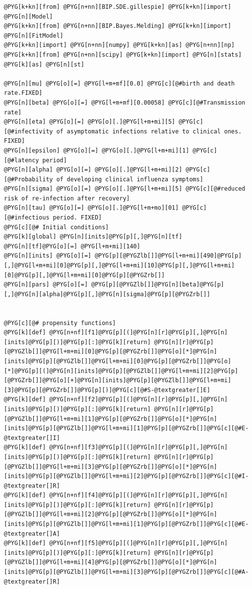 \documentclass[a4paper,10pt,english]{manual}
\begin{document}
\begin{Verbatim}[commandchars=@\[\]]
@PYG[k+kn][from] @PYG[n+nn][BIP.SDE.gillespie] @PYG[k+kn][import] @PYG[n][Model]
@PYG[k+kn][from] @PYG[n+nn][BIP.Bayes.Melding] @PYG[k+kn][import] @PYG[n][FitModel]
@PYG[k+kn][import] @PYG[n+nn][numpy] @PYG[k+kn][as] @PYG[n+nn][np]
@PYG[k+kn][from] @PYG[n+nn][scipy] @PYG[k+kn][import] @PYG[n][stats] @PYG[k][as] @PYG[n][st]

@PYG[n][mu] @PYG[o][=] @PYG[l+m+mf][0.0] @PYG[c][@#birth and death rate.FIXED]
@PYG[n][beta] @PYG[o][=] @PYG[l+m+mf][0.00058] @PYG[c][@#Transmission rate]
@PYG[n][eta] @PYG[o][=] @PYG[o][.]@PYG[l+m+mi][5] @PYG[c][@#infectivity of asymptomatic infections relative to clinical ones. FIXED]
@PYG[n][epsilon] @PYG[o][=] @PYG[o][.]@PYG[l+m+mi][1] @PYG[c][@#latency period]
@PYG[n][alpha] @PYG[o][=] @PYG[o][.]@PYG[l+m+mi][2] @PYG[c][@#Probability of developing clinical influenza symptoms]
@PYG[n][sigma] @PYG[o][=] @PYG[o][.]@PYG[l+m+mi][5] @PYG[c][@#reduced risk of re-infection after recovery]
@PYG[n][tau] @PYG[o][=] @PYG[o][.]@PYG[l+m+mo][01] @PYG[c][@#infectious period. FIXED]
@PYG[c][@# Initial conditions]
@PYG[k][global] @PYG[n][inits]@PYG[p][,]@PYG[n][tf]
@PYG[n][tf]@PYG[o][=] @PYG[l+m+mi][140]
@PYG[n][inits] @PYG[o][=] @PYG[p][@PYGZlb[]]@PYG[l+m+mi][490]@PYG[p][,]@PYG[l+m+mi][0]@PYG[p][,]@PYG[l+m+mi][10]@PYG[p][,]@PYG[l+m+mi][0]@PYG[p][,]@PYG[l+m+mi][0]@PYG[p][@PYGZrb[]]
@PYG[n][pars] @PYG[o][=] @PYG[p][@PYGZlb[]]@PYG[n][beta]@PYG[p][,]@PYG[n][alpha]@PYG[p][,]@PYG[n][sigma]@PYG[p][@PYGZrb[]]


@PYG[c][@# propensity functions]
@PYG[k][def] @PYG[n+nf][f1]@PYG[p][(]@PYG[n][r]@PYG[p][,]@PYG[n][inits]@PYG[p][)]@PYG[p][:]@PYG[k][return] @PYG[n][r]@PYG[p][@PYGZlb[]]@PYG[l+m+mi][0]@PYG[p][@PYGZrb[]]@PYG[o][*]@PYG[n][inits]@PYG[p][@PYGZlb[]]@PYG[l+m+mi][0]@PYG[p][@PYGZrb[]]@PYG[o][*]@PYG[p][(]@PYG[n][inits]@PYG[p][@PYGZlb[]]@PYG[l+m+mi][2]@PYG[p][@PYGZrb[]]@PYG[o][+]@PYG[n][inits]@PYG[p][@PYGZlb[]]@PYG[l+m+mi][3]@PYG[p][@PYGZrb[]]@PYG[p][)]@PYG[c][@#S-@textgreater[]E]
@PYG[k][def] @PYG[n+nf][f2]@PYG[p][(]@PYG[n][r]@PYG[p][,]@PYG[n][inits]@PYG[p][)]@PYG[p][:]@PYG[k][return] @PYG[n][r]@PYG[p][@PYGZlb[]]@PYG[l+m+mi][1]@PYG[p][@PYGZrb[]]@PYG[o][*]@PYG[n][inits]@PYG[p][@PYGZlb[]]@PYG[l+m+mi][1]@PYG[p][@PYGZrb[]]@PYG[c][@#E-@textgreater[]I]
@PYG[k][def] @PYG[n+nf][f3]@PYG[p][(]@PYG[n][r]@PYG[p][,]@PYG[n][inits]@PYG[p][)]@PYG[p][:]@PYG[k][return] @PYG[n][r]@PYG[p][@PYGZlb[]]@PYG[l+m+mi][3]@PYG[p][@PYGZrb[]]@PYG[o][*]@PYG[n][inits]@PYG[p][@PYGZlb[]]@PYG[l+m+mi][2]@PYG[p][@PYGZrb[]]@PYG[c][@#I-@textgreater[]R]
@PYG[k][def] @PYG[n+nf][f4]@PYG[p][(]@PYG[n][r]@PYG[p][,]@PYG[n][inits]@PYG[p][)]@PYG[p][:]@PYG[k][return] @PYG[n][r]@PYG[p][@PYGZlb[]]@PYG[l+m+mi][2]@PYG[p][@PYGZrb[]]@PYG[o][*]@PYG[n][inits]@PYG[p][@PYGZlb[]]@PYG[l+m+mi][1]@PYG[p][@PYGZrb[]]@PYG[c][@#E-@textgreater[]A]
@PYG[k][def] @PYG[n+nf][f5]@PYG[p][(]@PYG[n][r]@PYG[p][,]@PYG[n][inits]@PYG[p][)]@PYG[p][:]@PYG[k][return] @PYG[n][r]@PYG[p][@PYGZlb[]]@PYG[l+m+mi][4]@PYG[p][@PYGZrb[]]@PYG[o][*]@PYG[n][inits]@PYG[p][@PYGZlb[]]@PYG[l+m+mi][3]@PYG[p][@PYGZrb[]]@PYG[c][@#A-@textgreater[]R]


\end{Verbatim}
\end{document}
